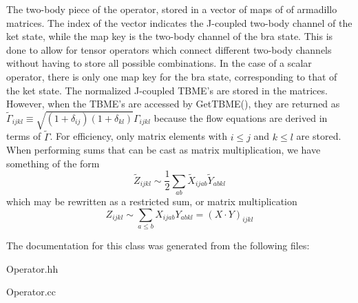 The two-\/body piece of the operator, stored in a vector of maps of of armadillo matrices. The index of the vector indicates the J-\/coupled two-\/body channel of the ket state, while the map key is the two-\/body channel of the bra state. This is done to allow for tensor operators which connect different two-\/body channels without having to store all possible combinations. In the case of a scalar operator, there is only one map key for the bra state, corresponding to that of the ket state. The normalized J-\/coupled T\-B\-M\-E's are stored in the matrices. However, when the T\-B\-M\-E's are accessed by Get\-T\-B\-M\-E(), they are returned as $ \tilde{\Gamma}_{ijkl} \equiv \sqrt{(1+\delta_{ij})(1+\delta_{kl})} \Gamma_{ijkl} $ because the flow equations are derived in terms of $ \tilde{\Gamma} $. For efficiency, only matrix elements with $ i\leq j $ and $ k\leq l $ are stored. When performing sums that can be cast as matrix multiplication, we have something of the form \[ \tilde{Z}_{ijkl} \sim \frac{1}{2} \sum_{ab}\tilde{X}_{ijab} \tilde{Y}_{abkl} \] which may be rewritten as a restricted sum, or matrix multiplication \[ Z_{ijkl} \sim \sum_{a\leq b} X_{ijab} Y_{abkl} = \left( X\cdot Y \right)_{ijkl} \] 

The documentation for this class was generated from the following files\-:\begin{DoxyCompactItemize}
\item 
Operator.\-hh\item 
Operator.\-cc\end{DoxyCompactItemize}
